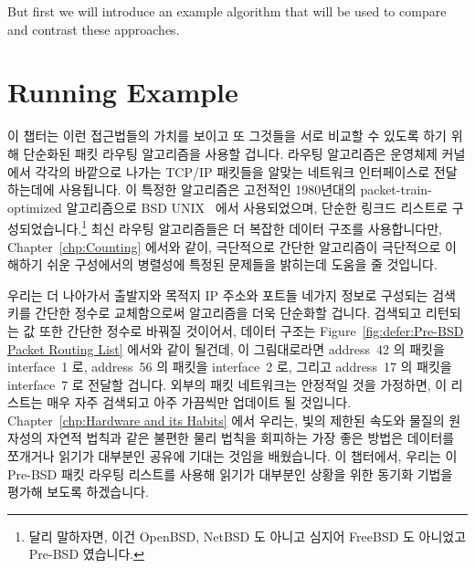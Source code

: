 But first we will introduce an example algorithm that will be used
to compare and contrast these approaches.
\fi

\section{Running Example}
\label{sec:defer:Running Example}

이 챕터는 이런 접근법들의 가치를 보이고 또 그것들을 서로 비교할 수 있도록 하기
위해 단순화된 패킷 라우팅 알고리즘을 사용할 겁니다.
라우팅 알고리즘은 운영체제 커널에서 각각의 바깥으로 나가는 TCP/IP 패킷들을
알맞는 네트워크 인터페이스로 전달하는데에 사용됩니다.
이 특정한 알고리즘은 고전적인 1980년대의 packet-train-optimized 알고리즘으로
BSD UNIX~\cite{VanJacobson88} 에서 사용되었으며, 단순한 링크드 리스트로
구성되었습니다.\footnote{
	달리 말하자면, 이건 OpenBSD, NetBSD 도 아니고 심지어 FreeBSD 도
	아니었고 Pre-BSD 였습니다.}
최신 라우팅 알고리즘들은 더 복잡한 데이터 구조를 사용합니다만,
Chapter~\ref{chp:Counting} 에서와 같이, 극단적으로 간단한 알고리즘이 극단적으로
이해하기 쉬운 구성에서의 병렬성에 특정된 문제들을 밝히는데 도움을 줄 것입니다.

우리는 더 나아가서 출발지와 목적지 IP 주소와 포트들 네가지 정보로 구성되는 검색
키를 간단한 정수로 교체함으로써 알고리즘을 더욱 단순화할 겁니다.
검색되고 리턴되는 값 또한 간단한 정수로 바꿔질 것이어서, 데이터 구조는
Figure~\ref{fig:defer:Pre-BSD Packet Routing List} 에서와 같이 될건데,
이 그림대로라면 address~42 의 패킷을 interface~1 로, address~56 의 패킷을
interface~2 로, 그리고 address~17 의 패킷을 interface~7 로 전달할 겁니다.
외부의 패킷 네트워크는 안정적일 것을 가정하면, 이 리스트는 매우 자주 검색되고
아주 가끔씩만 업데이트 될 것입니다.
Chapter~\ref{chp:Hardware and its Habits} 에서 우리는, 빛의 제한된 속도와
물질의 원자성의 자연적 법칙과 같은 불편한 물리 법칙을 회피하는 가장 좋은 방법은
데이터를 쪼개거나 읽기가 대부분인 공유에 기대는 것임을 배웠습니다.
이 챕터에서, 우리는 이 Pre-BSD 패킷 라우팅 리스트를 사용해 읽기가 대부분인
상황을 위한 동기화 기법을 평가해 보도록 하겠습니다.
\iffalse

